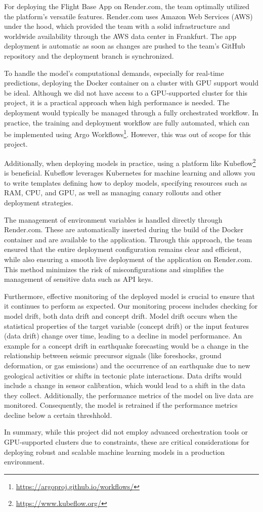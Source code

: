 For deploying the Flight Base App on Render.com, the team optimally utilized the platform's versatile features. Render.com uses Amazon Web Services (AWS) under the hood, which provided the team with a solid infrastructure and worldwide availability through the AWS data center in Frankfurt. The app deployment is automatic as soon as changes are pushed to the team's GitHub repository and the deployment branch is synchronized.

To handle the model's computational demands, especially for real-time predictions, deploying the Docker container on a cluster with GPU support would be ideal. Although we did not have access to a GPU-supported cluster for this project, it is a practical approach when high performance is needed. The deployment would typically be managed through a fully orchestrated workflow. In practice, the training and deployment workflow are fully automated, which can be implemented using Argo Workflows\footnote{\url{https://argoproj.github.io/workflows/}}. However, this was out of scope for this project.

Additionally, when deploying models in practice, using a platform like Kubeflow\footnote{\url{https://www.kubeflow.org/}} is beneficial. Kubeflow leverages Kubernetes for machine learning and allows you to write templates defining how to deploy models, specifying resources such as RAM, CPU, and GPU, as well as managing canary rollouts and other deployment strategies.

The management of environment variables is handled directly through Render.com. These are automatically inserted during the build of the Docker container and are available to the application. Through this approach, the team ensured that the entire deployment configuration remains clear and efficient, while also ensuring a smooth live deployment of the application on Render.com. This method minimizes the risk of misconfigurations and simplifies the management of sensitive data such as API keys.

Furthermore, effective monitoring of the deployed model is crucial to ensure that it continues to perform as expected. Our monitoring process includes checking for model drift, both data drift and concept drift. Model drift occurs when the statistical properties of the target variable (concept drift) or the input features (data drift) change over time, leading to a decline in model performance. An example for a concept drift in earthquake forecasting would be a change in the relationship between seismic precursor signals (like foreshocks, ground deformation, or gas emissions) and the occurrence of an earthquake due to new geological activities or shifts in tectonic plate interactions. Data drifts would include a change in sensor calibration, which would lead to a shift in the data they collect. Additionally, the performance metrics of the model on live data are monitored. Consequently, the model is retrained if the performance metrics decline below a certain threshhold.

In summary, while this project did not employ advanced orchestration tools or GPU-supported clusters due to constraints, these are critical considerations for deploying robust and scalable machine learning models in a production environment.
